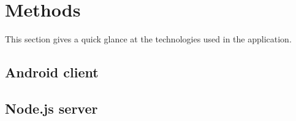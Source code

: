 \section{Methods}
This section gives a quick glance at the technologies used in the application.

\subsection{Android client}

\subsection{Node.js server}